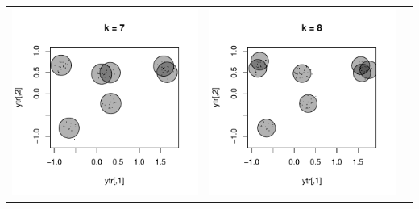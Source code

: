 \documentclass{beamer}
\begin{document}
\begin{frame}
\begin{center}
\begin{tabular}{ccc}
\includegraphics[scale = \scalesize, clip = true, trim = 0.3in 0.4in 0.3in 0.2in]{../conformal_kmeans/k7.pdf} &
\includegraphics[scale = \scalesize, clip = true, trim = 0.3in 0.4in 0.3in 0.2in]{../conformal_kmeans/k8.pdf} &

\end{tabular}
\end{center}
\end{frame}
\end{document}
